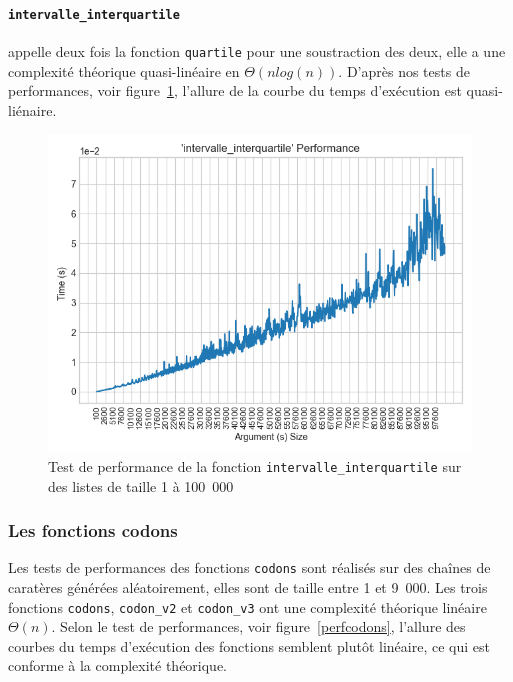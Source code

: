 \documentclass[12pt]{article}
\begin{document}
\paragraph{\texttt{intervalle\_interquartile}} appelle deux fois la fonction \texttt{quartile} pour une soustraction des deux, elle a une complexité théorique quasi-linéaire en $\Theta(nlog(n))$. D'après nos tests de performances, voir figure~\ref{perfintquart}, l'allure de la courbe du temps d'exécution est quasi-liénaire.
     \begin{figure}[!h]
        \centering
        \includegraphics[scale=0.78]{Images/Performance/Stats/performance_interquartile_100000.png}
        \caption{Test de performance de la fonction \texttt{intervalle\_interquartile} sur des listes de taille 1 à 100~000}
        \label{perfintquart}
    \end{figure}

\newpage

\subsubsection{Les fonctions codons}
Les tests de performances des fonctions \texttt{codons} sont réalisés sur des chaînes de caratères générées aléatoirement, elles sont de taille entre 1 et 9~000.
Les trois fonctions \texttt{codons}, \texttt{codon\_v2} et \texttt{codon\_v3} ont une complexité théorique linéaire $\Theta(n)$. Selon le test de performances, voir figure~\ref{perfcodons}, l'allure des courbes du temps d'exécution des fonctions semblent plutôt linéaire, ce qui est conforme à la complexité théorique.
\end{document}
